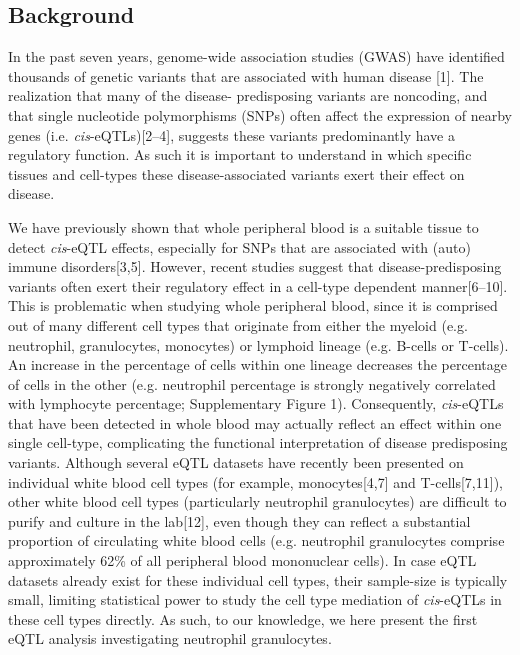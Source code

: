   \subsection{Background}
  In the past seven years, genome-wide association studies (GWAS) have identified thousands of genetic 
  variants that are associated with human disease [1]. The realization that many of the disease-
  predisposing variants are noncoding, and that single nucleotide polymorphisms (SNPs) often affect 
  the expression of nearby genes (i.e. \emph{cis}-eQTLs)[2–4], suggests these variants predominantly have a 
  regulatory function. As such it is important to understand in which specific tissues and cell-types 
  these disease-associated variants exert their effect on disease.

  We have previously shown that whole peripheral blood is a suitable tissue to detect \emph{cis}-eQTL effects, 
  especially for SNPs that are associated with (auto) immune disorders[3,5]. However, recent studies 
  suggest that disease-predisposing variants often exert their regulatory effect in a cell-type dependent 
  manner[6–10]. This is problematic when studying whole peripheral blood, since it is comprised out of 
  many different cell types that originate from either the myeloid (e.g. neutrophil, granulocytes, 
  monocytes) or lymphoid lineage (e.g. B-cells or T-cells). An increase in the percentage of cells 
  within one lineage decreases the percentage of cells in the other (e.g. neutrophil percentage is 
  strongly negatively correlated with lymphocyte percentage; Supplementary Figure 1). Consequently, 
  \emph{cis}-eQTLs that have been detected in whole blood may actually reflect an effect within one single 
  cell-type, complicating the functional interpretation of disease predisposing variants. Although 
  several eQTL datasets have recently been presented on individual white blood cell types (for example, 
  monocytes[4,7] and T-cells[7,11]), other white blood cell types (particularly neutrophil granulocytes) 
  are difficult to purify and culture in the lab[12], even though they can reflect a substantial 
  proportion of circulating white blood cells (e.g. neutrophil granulocytes comprise approximately 62\% 
  of all peripheral blood mononuclear cells). In case eQTL datasets already exist for these individual 
  cell types, their sample-size is typically small, limiting statistical power to study the cell type 
  mediation of \emph{cis}-eQTLs in these cell types directly. As such, to our knowledge, we here present the 
  first eQTL analysis investigating neutrophil granulocytes.

